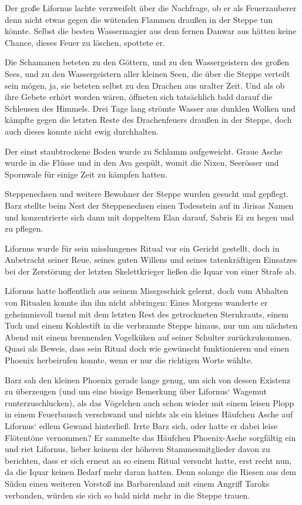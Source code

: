 Der große Lifornus lachte verzweifelt über die Nachfrage, ob er als Feuerzauberer denn nicht etwas gegen die wütenden Flammen draußen in der Steppe tun könnte. Selbst die besten Wassermagier aus dem fernen Danwar aus hätten keine Chance, dieses Feuer zu löschen, spottete er.

Die Schamanen beteten zu den Göttern, und zu den Wassergeistern des großen Sees, und zu den Wassergeistern aller kleinen Seen, die über die Steppe verteilt sein mögen, ja, sie beteten selbst zu den Drachen aus uralter Zeit. Und als ob ihre Gebete erhört worden wären, öffneten sich tatsächlich bald darauf die Schleusen des Himmels. Drei Tage lang strömte Wasser aus dunklen Wolken und kämpfte gegen die letzten Reste des Drachenfeuers draußen in der Steppe, doch auch dieses konnte nicht ewig durchhalten.

Der einst staubtrockene Boden wurde zu Schlamm aufgeweicht. Graue Asche wurde in die Flüsse und in den Ava gespült, womit die Nixen, Seerösser und Spornwale für einige Zeit zu kämpfen hatten.

Steppenechsen und weitere Bewohner der Steppe wurden gesucht und gepflegt. Barz stellte beim Nest der Steppenechsen einen Todesstein auf in Jirisas Namen und konzentrierte sich dann mit doppeltem Elan darauf, Sabris Ei zu hegen und zu pflegen.

Lifornus wurde für sein misslungenes Ritual vor ein Gericht gestellt, doch in Anbetracht seiner Reue, seines guten Willens und seines tatenkräftigen Einsatzes bei der Zerstörung der letzten Skelettkrieger ließen die Iquar von einer Strafe ab.

Lifornus hatte hoffentlich aus seinem Missgeschick gelernt, doch vom Abhalten von Ritualen konnte ihn ihn nicht abbringen: Eines Morgens wanderte er geheimnisvoll tuend mit dem letzten Rest des getrockneten Sternkrauts, einem Tuch und einem Kohlestift in die verbrannte Steppe hinaus, nur um am nächsten Abend mit einem brennenden Vogelküken auf seiner Schulter zurückzukommen. Quasi als Beweis, dass sein Ritual doch wie gewünscht funktionieren und einen Phoenix herbeirufen konnte, wenn er nur die richtigen Worte wählte.

Barz sah den kleinen Phoenix gerade lange genug, um sich von dessen Existenz zu überzeugen (und um eine bissige Bemerkung über Lifornus‘ Wagemut runterzuschlucken), als das Vögelchen auch schon wieder mit einem leisen Plopp in einem Feuerbausch verschwand und nichts als ein kleines Häufchen Asche auf Lifornus‘ edlem Gewand hinterließ. Irrte Barz sich, oder hatte er dabei leise Flötentöne vernommen? Er sammelte das Häufchen Phoenix-Asche sorgfältig ein und riet Lifornus, lieber keinem der höheren Stammesmitglieder davon zu berichten, dass er sich erneut an so einem Ritual versucht hatte, erst recht nun, da die Iquar keinen Bedarf mehr daran hatten. Denn solange die Riesen aus dem Süden einen weiteren Vorstoß ins Barbarenland mit einem Angriff Taroks verbanden, würden sie sich so bald nicht mehr in die Steppe trauen.

